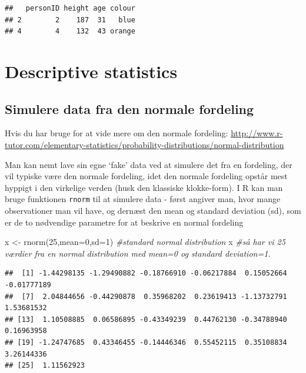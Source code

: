 \documentclass[
]{book}
\newenvironment{Shaded}{\begin{snugshade}}{\end{snugshade}}
\newcommand{\AttributeTok}[1]{\textcolor[rgb]{0.77,0.63,0.00}{#1}}
\newcommand{\CommentTok}[1]{\textcolor[rgb]{0.56,0.35,0.01}{\textit{#1}}}
\newcommand{\DecValTok}[1]{\textcolor[rgb]{0.00,0.00,0.81}{#1}}
\newcommand{\FunctionTok}[1]{\textcolor[rgb]{0.00,0.00,0.00}{#1}}
\newcommand{\NormalTok}[1]{#1}
\newcommand{\OtherTok}[1]{\textcolor[rgb]{0.56,0.35,0.01}{#1}}
\begin{document}
\begin{verbatim}
##   personID height age colour
## 2        2    187  31   blue
## 4        4    132  43 orange
\end{verbatim}

\hypertarget{descriptive-statistics}{%
\section{Descriptive statistics}\label{descriptive-statistics}}

\hypertarget{simulere-data-fra-den-normale-fordeling}{%
\subsection{Simulere data fra den normale fordeling}\label{simulere-data-fra-den-normale-fordeling}}

Hvis du har bruge for at vide mere om den normale fordeling: \url{http://www.r-tutor.com/elementary-statistics/probability-distributions/normal-distribution}

Man kan nemt lave sin egne `fake' data ved at simulere det fra en fordeling, der vil typiske være den normale fordeling, idet den normale fordeling opstår mest hyppigt i den virkelige verden (husk den klassiske klokke-form). I R kan man bruge funktionen \texttt{rnorm} til at simulere data - først angiver man, hvor mange observationer man vil have, og dernæst den mean og standard deviation (sd), som er de to nødvendige parametre for at beskrive en normal fordeling

\begin{Shaded}
\begin{Highlighting}[]
\NormalTok{x }\OtherTok{\textless{}{-}} \FunctionTok{rnorm}\NormalTok{(}\DecValTok{25}\NormalTok{,}\AttributeTok{mean=}\DecValTok{0}\NormalTok{,}\AttributeTok{sd=}\DecValTok{1}\NormalTok{) }\CommentTok{\#standard normal distribution}
\NormalTok{x }\CommentTok{\#så har vi 25 værdier fra en normal distribution med mean=0 og standard deviation=1.}
\end{Highlighting}
\end{Shaded}

\begin{verbatim}
##  [1] -1.44298135 -1.29490882 -0.18766910 -0.06217884  0.15052664 -0.01777189
##  [7]  2.04844656 -0.44290878  0.35968202  0.23619413 -1.13732791  1.53681532
## [13]  1.10508885  0.06586895 -0.43349239  0.44762130 -0.34788940  0.16963958
## [19] -1.24747685  0.43346455 -0.14446346  0.55452115  0.35108834  3.26144336
## [25]  1.11562923
\end{verbatim}
\end{document}
